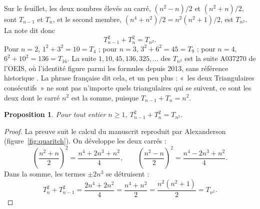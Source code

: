 \documentclass[11pt,a4paper]{article}
\newtheorem{proposition}{Proposition}
\theoremstyle{remark}
\begin{document}
Sur le feuillet, les deux nombres élevés au carré,
$(n^2-n)/2$ et $(n^2+n)/2$, sont $T_{n-1}$ et $T_n$, et le second membre,
$(n^4+n^2)/2 = n^2(n^2+1)/2$, est $T_{n^2}$. La note dit donc
\begin{equation}\label{eq:note}
T_{n-1}^{2} + T_n^{2} = T_{n^2}.
\end{equation}
Pour $n = 2$, $1^2 + 3^2 = 10 = T_4$ ; pour $n = 3$, $3^2 + 6^2 = 45 = T_9$ ;
pour $n = 4$, $6^2 + 10^2 = 136 = T_{16}$. La suite $1, 10, 45, 136,
325, \dots$ des $T_{n^2}$ est la suite A037270 de l'OEIS, où l'identité
figure parmi les formules depuis 2013, sans référence historique
\cite[A037270]{oeis}. La phrase française dit cela, et
un peu plus : «~les deux Triangulaires consécutifs~» ne sont pas n'importe
quels triangulaires qui se suivent, ce sont les deux dont le carré $n^2$ est
la somme, puisque $T_{n-1} + T_n = n^2$.

\begin{proposition}\label{prop:note}
Pour tout entier $n \geq 1$, $T_{n-1}^2 + T_n^2 = T_{n^2}$.
\end{proposition}

\begin{proof}
La preuve suit le calcul du manuscrit reproduit par Alexanderson
(figure~\ref{fig:quaritch}). On développe les deux carrés :
\[
\left(\frac{n^2+n}{2}\right)^2 = \frac{n^4 + 2n^3 + n^2}{4},
\qquad
\left(\frac{n^2-n}{2}\right)^2 = \frac{n^4 - 2n^3 + n^2}{4}.
\]
Dans la somme, les termes $\pm 2n^3$ se détruisent :
\[
T_n^2 + T_{n-1}^2 = \frac{2n^4 + 2n^2}{4} = \frac{n^4 + n^2}{2}
= \frac{n^2(n^2+1)}{2} = T_{n^2}.
\]
\end{proof}
\end{document}
